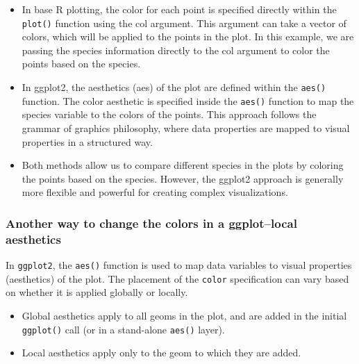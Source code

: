 \documentclass[
  letterpaper,
  DIV=11,
  numbers=noendperiod]{scrreprt}
\begin{document}
\begin{tcolorbox}[enhanced jigsaw, bottomtitle=1mm, bottomrule=.15mm, toprule=.15mm, opacityback=0, leftrule=.75mm, breakable, colback=white, toptitle=1mm, left=2mm, coltitle=black, titlerule=0mm, opacitybacktitle=0.6, title=\textcolor{quarto-callout-note-color}{\faInfo}\hspace{0.5em}{Why are colors specified differently in base R and ggplot?}, rightrule=.15mm, arc=.35mm, colframe=quarto-callout-note-color-frame, colbacktitle=quarto-callout-note-color!10!white]

\begin{itemize}
\item
  In base R plotting, the color for each point is specified directly
  within the \texttt{plot()} function using the col argument. This
  argument can take a vector of colors, which will be applied to the
  points in the plot. In this example, we are passing the species
  information directly to the col argument to color the points based on
  the species.
\item
  In ggplot2, the aesthetics (aes) of the plot are defined within the
  \texttt{aes()} function. The color aesthetic is specified inside the
  \texttt{aes()} function to map the species variable to the colors of
  the points. This approach follows the grammar of graphics philosophy,
  where data properties are mapped to visual properties in a structured
  way.
\item
  Both methods allow us to compare different species in the plots by
  coloring the points based on the species. However, the ggplot2
  approach is generally more flexible and powerful for creating complex
  visualizations.
\end{itemize}

\end{tcolorbox}

\subsubsection{Another way to change the colors in a ggplot--local
aesthetics}\label{another-way-to-change-the-colors-in-a-ggplotlocal-aesthetics}

In \texttt{ggplot2}, the \texttt{aes()} function is used to map data
variables to visual properties (aesthetics) of the plot. The placement
of the \texttt{color} specification can vary based on whether it is
applied globally or locally.

\begin{itemize}
\item
  Global aesthetics apply to all geoms in the plot, and are added in the
  initial \texttt{ggplot()} call (or in a stand-alone \texttt{aes()}
  layer).
\item
  Local aesthetics apply only to the geom to which they are added.
\end{itemize}
\end{document}
